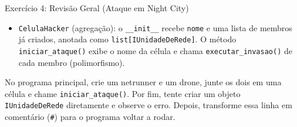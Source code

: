 \begin{exercicio}{Exercício 4: Revisão Geral (Ataque em Night City)}
\begin{itemize}
    \item \texttt{CelulaHacker} (agregação): o \texttt{\_\_init\_\_} recebe \texttt{nome} e
    uma lista de membros já criados, anotada como \texttt{list[IUnidadeDeRede]}. O método
    \texttt{iniciar\_ataque()} exibe o nome da célula e chama \texttt{executar\_invasao()} de
    cada membro (polimorfismo).
\end{itemize}

No programa principal, crie um netrunner e um drone, junte os dois em uma célula e chame
\texttt{iniciar\_ataque()}. Por fim, tente criar um objeto \texttt{IUnidadeDeRede}
diretamente e observe o erro. Depois, transforme essa linha em comentário (\texttt{\#}) para o
programa voltar a rodar.
\end{exercicio}
